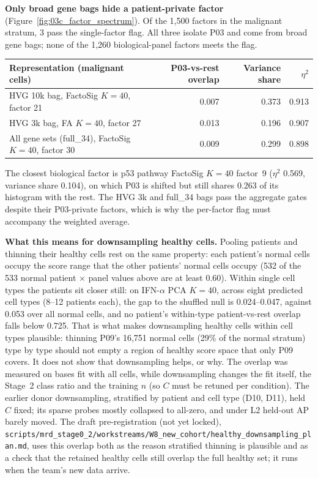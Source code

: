 \textbf{Only broad gene bags hide a patient-private factor} (Figure~\ref{fig:03c_factor_spectrum}). Of the 1,500 factors in the malignant stratum, 3 pass the single-factor flag. All three isolate P03 and come from broad gene bags; none of the 1,260 biological-panel factors meets the flag.

\begin{center}
\small
\setlength{\tabcolsep}{4pt}
\begin{tabular}{lrrr}
\toprule
Representation (malignant cells) & P03-vs-rest overlap & Variance share & $\eta^2$ \\
\midrule
HVG 10k bag, FactoSig $K = 40$, factor 21 & 0.007 & 0.373 & 0.913 \\
HVG 3k bag, FA $K = 40$, factor 27 & 0.013 & 0.196 & 0.907 \\
All gene sets (full\_34), FactoSig $K = 40$, factor 30 & 0.009 & 0.299 & 0.898 \\
\bottomrule
\end{tabular}
\end{center}

The closest biological factor is p53 pathway FactoSig $K = 40$ factor~9 ($\eta^2$ 0.569, variance share 0.104), on which P03 is shifted but still shares 0.263 of its histogram with the rest. The HVG 3k and full\_34 bags pass the aggregate gates despite their P03-private factors, which is why the per-factor flag must accompany the weighted average.

\textbf{What this means for downsampling healthy cells.} Pooling patients and thinning their healthy cells rest on the same property: each patient's normal cells occupy the score range that the other patients' normal cells occupy (532 of the 533 normal patient $\times$ panel values above are at least 0.60). Within single cell types the patients sit closer still: on IFN-$\alpha$ PCA $K = 40$, across eight predicted cell types (8--12 patients each), the gap to the shuffled null is 0.024--0.047, against 0.053 over all normal cells, and no patient's within-type patient-vs-rest overlap falls below 0.725. That is what makes downsampling healthy cells within cell types plausible: thinning P09's 16,751 normal cells (29\% of the normal stratum) type by type should not empty a region of healthy score space that only P09 covers. It does not show that downsampling helps, or why. The overlap was measured on bases fit with all cells, while downsampling changes the fit itself, the Stage~2 class ratio and the training $n$ (so $C$ must be retuned per condition). The earlier donor downsampling, stratified by patient and cell type (D10, D11), held $C$ fixed; its sparse probes mostly collapsed to all-zero, and under L2 held-out AP barely moved. The draft pre-registration (not yet locked), \nolinkurl{scripts/mrd_stage0_2/workstreams/W8_new_cohort/healthy_downsampling_plan.md}, uses this overlap both as the reason stratified thinning is plausible and as a check that the retained healthy cells still overlap the full healthy set; it runs when the team's new data arrive. 

